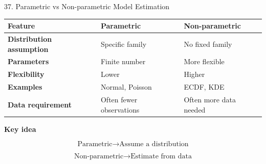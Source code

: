 \begin{frame}{37. Parametric vs Non-parametric Model Estimation}

\small

\begin{table}
\centering

\begin{tabular}{>{\bfseries}l l l}
\toprule
Feature & Parametric & Non-parametric \\
\midrule
Distribution assumption &
Specific family &
No fixed family \\

Parameters &
Finite number &
More flexible \\

Flexibility &
Lower &
Higher \\

Examples &
Normal, Poisson &
ECDF, KDE \\

Data requirement &
Often fewer observations &
Often more data needed \\

\bottomrule
\end{tabular}

\end{table}

\vspace{0.4cm}

\textbf{Key idea}

\[
\boxed{
\text{Parametric}
\rightarrow
\text{Assume a distribution}
}
\]

\[
\boxed{
\text{Non-parametric}
\rightarrow
\text{Estimate from data}
}
\]

\end{frame}




